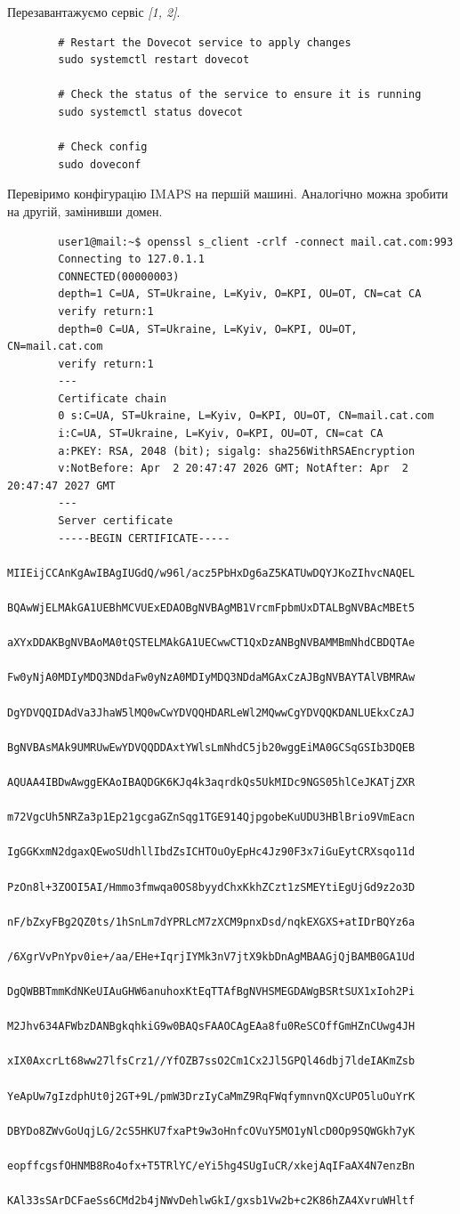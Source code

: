 \documentclass[14pt, a4paper]{extreport}
\begin{document}
	Перезавантажуємо сервіс \textit{[1, 2]}.
	
	\begin{verbatim}
		# Restart the Dovecot service to apply changes
		sudo systemctl restart dovecot
		
		# Check the status of the service to ensure it is running
		sudo systemctl status dovecot
		
		# Check config
		sudo doveconf
	\end{verbatim}
	
	Перевіримо конфігурацію IMAPS на першій машині. Аналогічно можна зробити на другій, замінивши домен.
	
	\begin{verbatim}
		user1@mail:~$ openssl s_client -crlf -connect mail.cat.com:993
		Connecting to 127.0.1.1
		CONNECTED(00000003)
		depth=1 C=UA, ST=Ukraine, L=Kyiv, O=KPI, OU=OT, CN=cat CA
		verify return:1
		depth=0 C=UA, ST=Ukraine, L=Kyiv, O=KPI, OU=OT, CN=mail.cat.com
		verify return:1
		---
		Certificate chain
		0 s:C=UA, ST=Ukraine, L=Kyiv, O=KPI, OU=OT, CN=mail.cat.com
		i:C=UA, ST=Ukraine, L=Kyiv, O=KPI, OU=OT, CN=cat CA
		a:PKEY: RSA, 2048 (bit); sigalg: sha256WithRSAEncryption
		v:NotBefore: Apr  2 20:47:47 2026 GMT; NotAfter: Apr  2 20:47:47 2027 GMT
		---
		Server certificate
		-----BEGIN CERTIFICATE-----
		MIIEijCCAnKgAwIBAgIUGdQ/w96l/acz5PbHxDg6aZ5KATUwDQYJKoZIhvcNAQEL
		BQAwWjELMAkGA1UEBhMCVUExEDAOBgNVBAgMB1VrcmFpbmUxDTALBgNVBAcMBEt5
		aXYxDDAKBgNVBAoMA0tQSTELMAkGA1UECwwCT1QxDzANBgNVBAMMBmNhdCBDQTAe
		Fw0yNjA0MDIyMDQ3NDdaFw0yNzA0MDIyMDQ3NDdaMGAxCzAJBgNVBAYTAlVBMRAw
		DgYDVQQIDAdVa3JhaW5lMQ0wCwYDVQQHDARLeWl2MQwwCgYDVQQKDANLUEkxCzAJ
		BgNVBAsMAk9UMRUwEwYDVQQDDAxtYWlsLmNhdC5jb20wggEiMA0GCSqGSIb3DQEB
		AQUAA4IBDwAwggEKAoIBAQDGK6KJq4k3aqrdkQs5UkMIDc9NGS05hlCeJKATjZXR
		m72VgcUh5NRZa3p1Ep21gcgaGZnSqg1TGE914QjpgobeKuUDU3HBlBrio9VmEacn
		IgGGKxmN2dgaxQEwoSUdhllIbdZsICHTOuOyEpHc4Jz90F3x7iGuEytCRXsqo11d
		PzOn8l+3ZOOI5AI/Hmmo3fmwqa0OS8byydChxKkhZCzt1zSMEYtiEgUjGd9z2o3D
		nF/bZxyFBg2QZ0ts/1hSnLm7dYPRLcM7zXCM9pnxDsd/nqkEXGXS+atIDrBQYz6a
		/6XgrVvPnYpv0ie+/aa/EHe+IqrjIYMk3nV7jtX9kbDnAgMBAAGjQjBAMB0GA1Ud
		DgQWBBTmmKdNKeUIAuGHW6anuhoxKtEqTTAfBgNVHSMEGDAWgBSRtSUX1xIoh2Pi
		M2Jhv634AFWbzDANBgkqhkiG9w0BAQsFAAOCAgEAa8fu0ReSCOffGmHZnCUwg4JH
		xIX0AxcrLt68ww27lfsCrz1//YfOZB7ssO2Cm1Cx2Jl5GPQl46dbj7ldeIAKmZsb
		YeApUw7gIzdphUt0j2GT+9L/pmW3DrzIyCaMmZ9RqFWqfymnvnQXcUPO5luOuYrK
		DBYDo8ZWvGoUqjLG/2cS5HKU7fxaPt9w3oHnfcOVuY5MO1yNlcD0Op9SQWGkh7yK
		eopffcgsfOHNMB8Ro4ofx+T5TRlYC/eYi5hg4SUgIuCR/xkejAqIFaAX4N7enzBn
		KAl33sSArDCFaeSs6CMd2b4jNWvDehlwGkI/gxsb1Vw2b+c2K86hZA4XvruWHltf

\end{verbatim}
\end{document}
